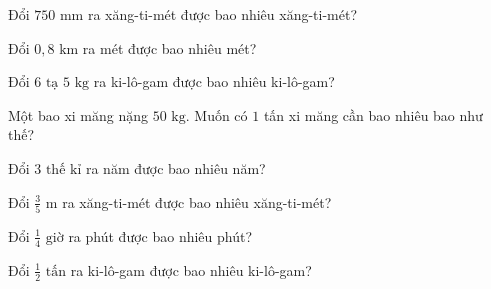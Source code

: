 \begin{ex}
  Đổi $750\text{ mm}$ ra xăng-ti-mét được bao nhiêu xăng-ti-mét?
\end{ex}

\begin{ex}
  Đổi $0{,}8\text{ km}$ ra mét được bao nhiêu mét?
\end{ex}

\begin{ex}
  Đổi $6\text{ tạ } 5\text{ kg}$ ra ki-lô-gam được bao nhiêu ki-lô-gam?
\end{ex}

\begin{ex}
  Một bao xi măng nặng $50\text{ kg}$. Muốn có $1$ tấn xi măng cần bao nhiêu bao như thế?
\end{ex}

\begin{ex}
  Đổi $3\text{ thế kỉ}$ ra năm được bao nhiêu năm?
\end{ex}

\begin{ex}
  Đổi $\frac{3}{5}\text{ m}$ ra xăng-ti-mét được bao nhiêu xăng-ti-mét?
\end{ex}

\begin{ex}
  Đổi $\frac{1}{4}\text{ giờ}$ ra phút được bao nhiêu phút?
\end{ex}

\begin{ex}
  Đổi $\frac{1}{2}\text{ tấn}$ ra ki-lô-gam được bao nhiêu ki-lô-gam?
\end{ex}
